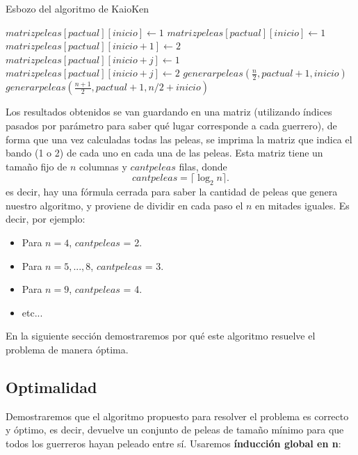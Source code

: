 \begin{algorithm}
\begin{algorithmic}
\caption{Esbozo del algoritmo de KaioKen}
    \State $matrizpeleas[pactual][inicio] \gets 1$
  \EndIf
    \State $matrizpeleas[pactual][inicio] \gets 1$
    \State $matrizpeleas[pactual][inicio + 1] \gets 2$
  \Else
    \For {$j \in [0,..., n)$}
        \State $matrizpeleas[pactual][inicio + j] \gets 1$
      \Else 
        \State $matrizpeleas[pactual][inicio + j] \gets 2$
      \EndIf
    \EndFor
    \State $generarpeleas(\frac{n}{2}, pactual+1, inicio)$
    \State $generarpeleas(\frac{n+1}{2}, pactual+1, n/2 + inicio)$
  \EndIf
  \EndProcedure
\end{algorithmic}
\end{algorithm}

Los resultados obtenidos se van guardando en una matriz (utilizando índices pasados por parámetro para saber qué lugar corresponde a cada guerrero), de forma que una vez calculadas todas las peleas, se imprima la matriz que indica el bando (1 o 2) de cada uno en cada una de las peleas. Esta matriz tiene un tamaño fijo de $n$ columnas y $cantpeleas$ filas, donde 
\[ cantpeleas = \lceil \log _2 n \rceil. \]
 es decir, hay una fórmula cerrada para saber la cantidad de peleas que genera nuestro algoritmo, y proviene de dividir en cada paso el $n$ en mitades iguales. Es decir, por ejemplo:
\begin{itemize}
\item Para $n = 4$, $cantpeleas$ = 2.
\item Para $n = 5,...,8$, $cantpeleas$ = 3.
\item Para $n = 9$, $cantpeleas$ = 4.
\item etc...
\end{itemize}
En la siguiente sección demostraremos por qué este algoritmo resuelve el problema de manera óptima.

\subsection{Optimalidad}

\par Demostraremos que el algoritmo propuesto para resolver el problema es correcto y óptimo, es decir, devuelve un conjunto de peleas de tamaño mínimo para que todos los guerreros hayan peleado entre sí. Usaremos \textbf{índucción global en n}:

